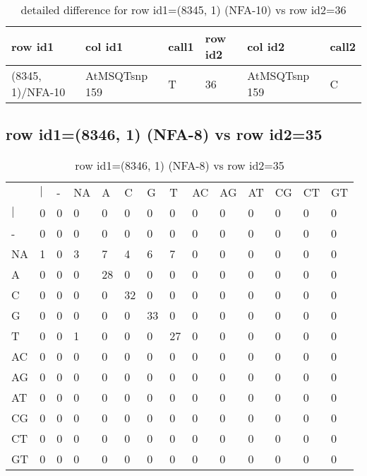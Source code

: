 \begin{center}
\begin{longtable}{|l|l|l|l|l|l|}
\caption{detailed difference for row id1=(8345, 1) (NFA-10) vs row id2=36} \label{table_dm363}\\
\hline
row id1&col id1&call1&row id2&col id2&call2\\
\hline
(8345, 1)/NFA-10&AtMSQTsnp 159&T&36&AtMSQTsnp 159&C\\
\hline
\end{longtable}
\end{center}

\subsection{row id1=(8346, 1) (NFA-8) vs row id2=35}
\begin{center}
\begin{longtable}{|l|l|l|l|l|l|l|l|l|l|l|l|l|l|}
\caption{row id1=(8346, 1) (NFA-8) vs row id2=35} \label{table_dm364}\\
\hline
\\
\hline
&$|$&-&NA&A&C&G&T&AC&AG&AT&CG&CT&GT\\
$|$&0&0&0&0&0&0&0&0&0&0&0&0&0\\
-&0&0&0&0&0&0&0&0&0&0&0&0&0\\
NA&1&0&3&7&4&6&7&0&0&0&0&0&0\\
A&0&0&0&28&0&0&0&0&0&0&0&0&0\\
C&0&0&0&0&32&0&0&0&0&0&0&0&0\\
G&0&0&0&0&0&33&0&0&0&0&0&0&0\\
T&0&0&1&0&0&0&27&0&0&0&0&0&0\\
AC&0&0&0&0&0&0&0&0&0&0&0&0&0\\
AG&0&0&0&0&0&0&0&0&0&0&0&0&0\\
AT&0&0&0&0&0&0&0&0&0&0&0&0&0\\
CG&0&0&0&0&0&0&0&0&0&0&0&0&0\\
CT&0&0&0&0&0&0&0&0&0&0&0&0&0\\
GT&0&0&0&0&0&0&0&0&0&0&0&0&0\\
\hline
\end{longtable}
\end{center}

